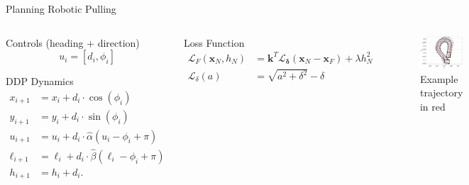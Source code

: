 \documentclass[10pt]{beamer}
\begin{document}
\begin{frame}{Planning Robotic Pulling}
  \begin{columns}[T,onlytextwidth]
    \begin{list}{}{
        \setlength{\leftmargin}{0pt}
        \setlength{\labelwidth}{0pt}
      }
    \item Controls (heading + direction)
      \begin{equation*}
        u_i = [d_i, \phi_i]
      \end{equation*}
    \item DDP Dynamics
      \begin{align*}
        x_{i+1} &= x_i + d_i\cdot\cos(\phi_i) \\
        y_{i+1} &= y_i + d_i\cdot\sin(\phi_i)\\
        u_{i+1} &= u_i + d_i\cdot\hat{\alpha}(u_i - \phi_i + \pi) \\
        \ell_{i+1} &= \ell_i + d_i\cdot\hat{\beta}(\ell_i - \phi_i + \pi)\\
        h_{i+1} &= h_i + d_i.
      \end{align*}
    \end{list}
    \begin{list}{}{
        \setlength{\leftmargin}{0pt}
        \setlength{\labelwidth}{0pt}
      }
    \item Loss Function
      \begin{align*}
        \mathcal{L}_F(\mathbf{x}_N,h_N) &= \mathbf{k}^T\mathcal{L}_{\bm{\delta}}(\mathbf{x}_N-\mathbf{x}_F) + \lambda h_N^2\\
        \mathcal{L}_{\delta}(a) &= \sqrt{a^2+\delta^2}-\delta
      \end{align*}
    \end{list}
    \begin{figure}
      \begin{center}
        \includegraphics[width=0.8\linewidth]{fig/trajectory_2.eps}
      \end{center}
      \caption{Example trajectory in red}
    \end{figure}
  \end{columns}
\end{frame}
\end{document}
